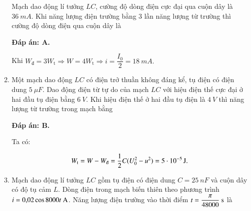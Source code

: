 \begin{enumerate}[label=\bfseries Câu \arabic*:]
	{
		Mạch dao động lí tưởng $LC$, cường độ dòng điện cực đại qua cuộn dây là $\SI{36}{mA}$. Khi năng lượng điện trường bằng 3 lần năng lượng từ trường thì cường độ dòng điện qua cuộn dây là
		
	}
	
	\hideall
	{		\textbf{Đáp án: A.}
		
		Khi $W_\text{đ} = 3W_\text{t} \Rightarrow W = 4W_\text{t} \Rightarrow i = \dfrac{I_0}{2} = \SI{18}{mA}.$
		
	}
	\item {}
	
	{
		Một mạch dao động $LC$ có điện trở thuần không đáng kể, tụ điện có điện dung $\SI{5}{\mu F}$. Dao động điện từ tự do của mạch $LC$ với hiệu điện thế cực đại ở hai đầu tụ điện bằng $\SI{6}{V}$. Khi hiệu điện thế ở hai đầu tụ điện là $\SI{4}{V}$ thì năng lượng từ trường trong mạch bằng
		
	}
	
	\hideall
	{		\textbf{Đáp án: B.}
		
		Ta có:
		
		$$W_\text t = W - W_\text{đ} = \dfrac{1}{2}C(U_0^2 - u^2) = \xsi{5\cdot 10^{-5}}{J}.$$
		
	}
	\item {}
	
	{Mạch dao động lí tưởng $LC$ gồm tụ điện có điện dung $C = \SI{25}{nF}$ và cuộn dây có độ tụ cảm $L$. Dòng điện trong mạch biến thiên theo phương trình $i = \text{0,02} \cos 8000 t\ \text A$. Năng lượng điện trường vào thời điểm $t = \dfrac{\pi}{48000}\ \text s$ là
		
	}
	

\end{enumerate}
